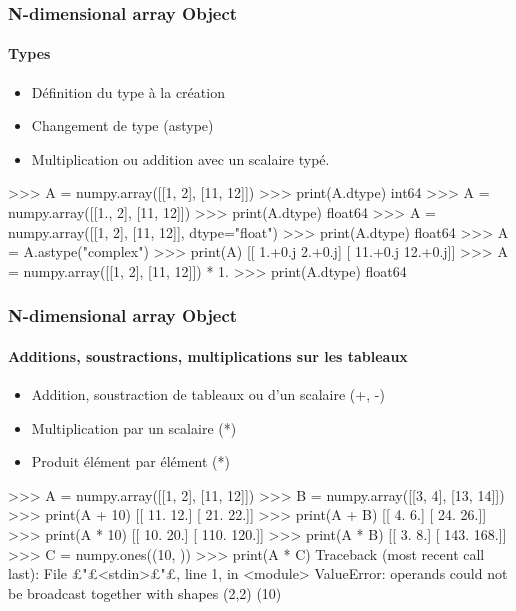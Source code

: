 \begin{frame}[fragile]
\frametitle{N-dimensional array Object}
\framesubtitle{Types}
\begin{itemize}
 \item Définition du type à la création
 \item Changement de type (astype)
 \item Multiplication ou addition avec un scalaire typé. 
\end{itemize}
\begin{pythonConsole}
>>> A = numpy.array([[1, 2], [11, 12]])
>>> print(A.dtype)
int64
>>> A = numpy.array([[1., 2], [11, 12]])
>>> print(A.dtype)
float64
>>> A = numpy.array([[1, 2], [11, 12]], dtype="float")
>>> print(A.dtype)
float64
>>> A = A.astype("complex")
>>> print(A)
[[  1.+0.j   2.+0.j]
 [ 11.+0.j  12.+0.j]]
>>> A = numpy.array([[1, 2], [11, 12]]) * 1.
>>> print(A.dtype)
float64
\end{pythonConsole}
\end{frame}
\begin{frame}[fragile]
\frametitle{N-dimensional array Object}
\framesubtitle{Additions, soustractions, multiplications sur les tableaux}
\begin{itemize}
 \item Addition, soustraction de tableaux ou d'un scalaire (+, -)
 \item Multiplication par un scalaire (*)
 \item Produit élément par élément (*) 
\end{itemize}
\begin{pythonConsole}
>>> A = numpy.array([[1, 2], [11, 12]])
>>> B = numpy.array([[3, 4], [13, 14]])
>>> print(A + 10)
[[ 11.  12.]
 [ 21.  22.]]
>>> print(A + B)
[[  4.   6.]
 [ 24.  26.]]
>>> print(A * 10)
[[  10.   20.]
 [ 110.  120.]]
>>> print(A * B)
[[   3.    8.]
 [ 143.  168.]]
>>> C = numpy.ones((10, ))
>>> print(A * C)
Traceback (most recent call last):
  File £"£<stdin>£"£, line 1, in <module>
ValueError: operands could not be broadcast together with shapes (2,2) (10) 
\end{pythonConsole}
\end{frame}
